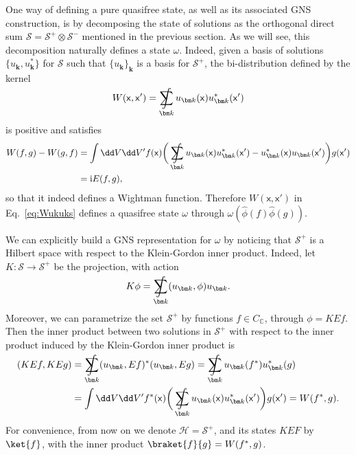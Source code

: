 \documentclass[letterpaper,12pt,titlepage,oneside,final]{book}
\renewcommand{\S}{\mathcal{S}}
\newcommand{\mf}{\mathsf}%
\newcommand{\ii}{\mathrm{i}}
\DeclareMathOperator*{\sumint}{%
\mathchoice%
  {\ooalign{$\displaystyle\sum$\cr\hidewidth$\displaystyle\int$\hidewidth\cr}}
  {\ooalign{\raisebox{.14\height}{\scalebox{.7}{$\textstyle\sum$}}\cr\hidewidth$\textstyle\int$\hidewidth\cr}}
  {\ooalign{\raisebox{.2\height}{\scalebox{.6}{$\scriptstyle\sum$}}\cr$\scriptstyle\int$\cr}}
  {\ooalign{\raisebox{.2\height}{\scalebox{.6}{$\scriptstyle\sum$}}\cr$\scriptstyle\int$\cr}}
}
\begin{document}
One way of defining a pure quasifree state, as well as its associated GNS construction, is by decomposing the state of solutions as the orthogonal direct sum $\S = \S^+\otimes \S^-$ mentioned in the previous section. As we will see, this decomposition naturally defines a state $\omega$. Indeed, given a basis of solutions $\{u_{\bm k}, u_{\bm k}^*\}$ for $\S$ such that $\{u_{\bm k}\}_{\bm k}$ is a basis for $\S^+$, the bi-distribution defined by the kernel
\begin{equation}\label{eq:Wukuks}
    W(\mf x, \mf x') = \sumint_{\bm k}u_{\bm k}(\mf x)u_{\bm k}^*(\mf x')
\end{equation}
is positive and satisfies
\begin{align}
    W(f,g) - W(g,f) &= \int \dd V \dd V' f(\mf x) \bigg(\sumint_{\bm k}u_{\bm k}(\mf x) u_{\bm k}^*(\mf x') - u_{\bm k}^*(\mf x)u_{\bm k}(\mf x')\bigg)g(\mf x') \\
    &= \ii E(f,g),
\end{align}
so that it indeed defines a Wightman function. Therefore $W(\mf x,\mf x')$ in Eq.~\eqref{eq:Wukuks} defines a quasifree state $\omega$ through $\omega(\hat{\phi}(f)\hat{\phi}(g))$. 

We can explicitly build a GNS representation for $\omega$ by noticing that $\S^+$ is a Hilbert space with respect to the Klein-Gordon inner product. Indeed, let $K:\S\longrightarrow \S^+$ be the projection, with action
\begin{equation}
    K\phi = \sumint_{\bm k} (u_{\bm k},\phi) u_{\bm k}.
\end{equation}
Moreover, we can parametrize the set $\S^+$ by functions $f\in C_\mathbb{C}$, through $\phi = K E f$. Then the inner product between two solutions in $\S^+$ with respect to the inner product induced by the Klein-Gordon inner product is
\begin{align}
    ( K E f,K E g) &= \sumint_{\bm k} (u_{\bm k},Ef)^*(u_{\bm k},Eg) = \sumint_{\bm k} u_{\bm k}(f^*)u_{\bm k}^*(g)\\
    &=\int \dd V \dd V' f^*(\mf x) \bigg(\sumint_{\bm k} u_{\bm k}(\mf x) u_{\bm k}^*(\mf x')\bigg)g(\mf x') = W(f^*,g).
\end{align}
For convenience, from now on we denote $\mathscr{H} = \S^+$, and its states $KEF$ by $\ket{f}$, with the inner product $\braket{f}{g} = W(f^*,g)$. 

\end{document}
